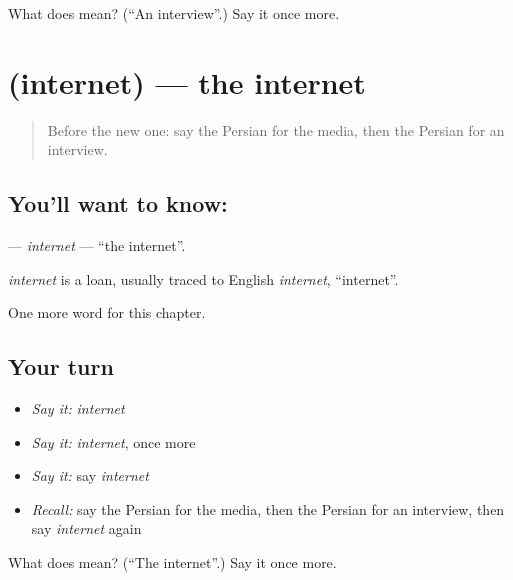 \begin{tcolorbox}[breakable,colback=teal!4,colframe=teal!35!black,title={Before you move on}]
What does  mean? (\textquotedblleft{}An interview\textquotedblright{}.) Say it once more.
\end{tcolorbox}
\section[\texorpdfstring{\fa{اینترنت} (internet)}{اینترنت (internet)}]{ (internet) — the internet}

\label{lesson:FA-C210-internet}



\begin{quote}
Before the new one: say the Persian for the media, then the Persian for an interview.
\end{quote}

\subsection*{You'll want to know: }
\textbf{} — \emph{internet} — \textquotedblleft{}the internet\textquotedblright{}.

\begin{cousinweb}
\emph{internet} is a loan, usually traced to English \emph{internet}, \textquotedblleft{}internet\textquotedblright{}.
\end{cousinweb}

\begin{grammarlens}[title={What you've built}]
One more word for this chapter.
\end{grammarlens}

\subsection*{Your turn}
\begin{itemize}
\raggedright
  \item \emph{Say it:} \emph{internet}
  \item \emph{Say it:} \emph{internet}, once more
  \item \emph{Say it:} say \emph{internet}
  \item \emph{Recall:} say the Persian for the media, then the Persian for an interview, then say \emph{internet} again
\end{itemize}

\begin{tcolorbox}[breakable,colback=teal!4,colframe=teal!35!black,title={Before you move on}]
What does  mean? (\textquotedblleft{}The internet\textquotedblright{}.) Say it once more.
\end{tcolorbox}
